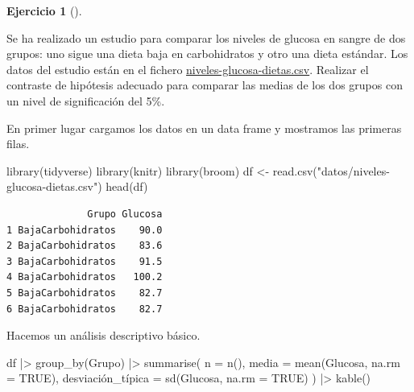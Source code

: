\documentclass[
  spanish,
  a4paper,
]{scrreport}
\newenvironment{Shaded}{\begin{snugshade}}{\end{snugshade}}
\newcommand{\AttributeTok}[1]{\textcolor[rgb]{0.40,0.45,0.13}{#1}}
\newcommand{\ConstantTok}[1]{\textcolor[rgb]{0.56,0.35,0.01}{#1}}
\newcommand{\FunctionTok}[1]{\textcolor[rgb]{0.28,0.35,0.67}{#1}}
\newcommand{\NormalTok}[1]{\textcolor[rgb]{0.00,0.23,0.31}{#1}}
\newcommand{\OtherTok}[1]{\textcolor[rgb]{0.00,0.23,0.31}{#1}}
\newcommand{\SpecialCharTok}[1]{\textcolor[rgb]{0.37,0.37,0.37}{#1}}
\newcommand{\StringTok}[1]{\textcolor[rgb]{0.13,0.47,0.30}{#1}}
\theoremstyle{definition}
\newtheorem{exercise}{Ejercicio}[chapter]
\theoremstyle{remark}
\begin{document}
\begin{exercise}[]\protect\hypertarget{exr-contraste-comparacion-medias-glucosa}{}\label{exr-contraste-comparacion-medias-glucosa}

Se ha realizado un estudio para comparar los niveles de glucosa en
sangre de dos grupos: uno sigue una dieta baja en carbohidratos y otro
una dieta estándar. Los datos del estudio están en el fichero
\href{datos/niveles-glucosa-dietas.csv}{niveles-glucosa-dietas.csv}.
Realizar el contraste de hipótesis adecuado para comparar las medias de
los dos grupos con un nivel de significación del 5\%.

\end{exercise}

\begin{tcolorbox}[enhanced jigsaw, arc=.35mm, bottomrule=.15mm, bottomtitle=1mm, breakable, colback=white, colbacktitle=quarto-callout-tip-color!10!white, colframe=quarto-callout-tip-color-frame, coltitle=black, left=2mm, leftrule=.75mm, opacityback=0, opacitybacktitle=0.6, rightrule=.15mm, title=\textcolor{quarto-callout-tip-color}{\faLightbulb}\hspace{0.5em}{Solución}, titlerule=0mm, toprule=.15mm, toptitle=1mm]

En primer lugar cargamos los datos en un data frame y mostramos las
primeras filas.

\begin{Shaded}
\begin{Highlighting}[]
\FunctionTok{library}\NormalTok{(tidyverse)}
\FunctionTok{library}\NormalTok{(knitr)}
\FunctionTok{library}\NormalTok{(broom)}
\NormalTok{df }\OtherTok{\textless{}{-}} \FunctionTok{read.csv}\NormalTok{(}\StringTok{"datos/niveles{-}glucosa{-}dietas.csv"}\NormalTok{)}
\FunctionTok{head}\NormalTok{(df)}
\end{Highlighting}
\end{Shaded}

\begin{verbatim}
              Grupo Glucosa
1 BajaCarbohidratos    90.0
2 BajaCarbohidratos    83.6
3 BajaCarbohidratos    91.5
4 BajaCarbohidratos   100.2
5 BajaCarbohidratos    82.7
6 BajaCarbohidratos    82.7
\end{verbatim}

Hacemos un análisis descriptivo básico.

\begin{Shaded}
\begin{Highlighting}[]
\NormalTok{df }\SpecialCharTok{|\textgreater{}} 
    \FunctionTok{group\_by}\NormalTok{(Grupo) }\SpecialCharTok{|\textgreater{}} 
    \FunctionTok{summarise}\NormalTok{(}
        \AttributeTok{n =} \FunctionTok{n}\NormalTok{(),}
        \AttributeTok{media =} \FunctionTok{mean}\NormalTok{(Glucosa, }\AttributeTok{na.rm =} \ConstantTok{TRUE}\NormalTok{),}
\NormalTok{        desviación\_típica }\OtherTok{=} \FunctionTok{sd}\NormalTok{(Glucosa, }\AttributeTok{na.rm =} \ConstantTok{TRUE}\NormalTok{)}
\NormalTok{    ) }\SpecialCharTok{|\textgreater{}} 
    \FunctionTok{kable}\NormalTok{()}
\end{Highlighting}
\end{Shaded}


\end{tcolorbox}
\end{document}
